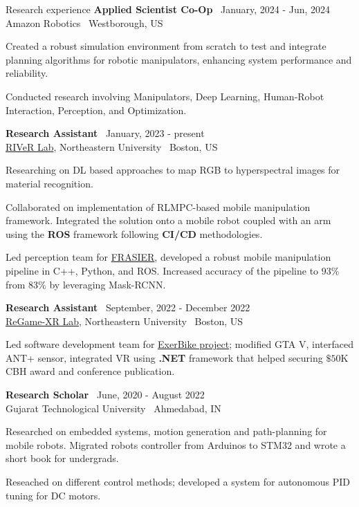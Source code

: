 \documentclass{resume}
\begin{document}
\begin{rSection}{Research experience}
{\bf Applied Scientist Co-Op} \hfill {\ January, 2024 - Jun, 2024 }\\ 
{Amazon Robotics} \hfill {\ {Westborough, US}}
\begin{cvitems}
    \item Created a robust simulation environment from scratch to test and integrate planning algorithms for robotic manipulators, enhancing system performance and reliability.
    \item Conducted research involving Manipulators, Deep Learning, Human-Robot Interaction, Perception, and Optimization.
\end{cvitems}
{\bf Research Assistant} \hfill {\ January, 2023 - present }\\ 
{\href{https://robot.neu.edu/}{RIVeR Lab}, Northeastern University} \hfill {\ {Boston, US}}
\begin{cvitems}
    \item Researching on DL based approaches to map RGB to hyperspectral images for material recognition. 
    \item Collaborated on implementation of RLMPC-based mobile manipulation framework. Integrated the solution onto a mobile robot coupled with an arm using the \textbf{ROS} framework following \textbf{CI/CD} methodologies. 
    \item Led perception team for \href{https://robot.neu.edu/}{FRASIER}, developed a robust mobile manipulation pipeline in C++, Python, and ROS. Increased accuracy of the pipeline to $93\%$ from $83\%$ by leveraging Mask-RCNN.
\end{cvitems}
{\bf Research Assistant} \hfill {\ September, 2022 - December 2022 }\\ 
{\href{https://regamexr.sites.northeastern.edu/}{ReGame-XR Lab}, Northeastern University} \hfill {\ {Boston, US}}
\begin{cvitems}
    \item Led software development team for \href{https://games.northeastern.edu/project/exerbike/}{ExerBike project}; modified GTA V, interfaced ANT+ sensor, integrated VR using \textbf{.NET} framework that helped securing $\$50$K CBH award and conference publication.
\end{cvitems}
{\bf Research Scholar} \hfill {\ June, 2020 - August 2022 }\\ 
{Gujarat Technological University} \hfill {\ {Ahmedabad, IN}}
\begin{cvitems}
    \item Researched on embedded systems, motion generation and path-planning for mobile robots. Migrated robots controller from Arduinos to STM32 and wrote a short book for undergrads.
    \item Reseached on different control methods; developed a system for autonomous PID tuning for DC motors.
\end{cvitems}
\end{rSection}
\end{document}
